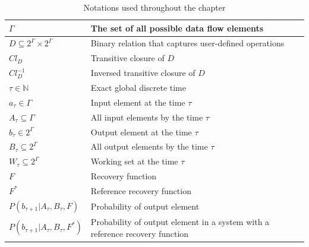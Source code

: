 \begin{table}[!b]
\begin {center}
    \caption{Notations used throughout the chapter}
    \begin{tabular}{l|p{5cm}}
        \hline
        $\Gamma$ & The set of all possible data flow elements \\ 
        \hline
        $D\subseteq{2^{\Gamma}\times2^{\Gamma}}$ & Binary relation that captures user-defined operations  \\
        \hline
        $Cl_D$ & Transitive closure of $D$  \\
        \hline
        $Cl^{-1}_D$ & Inversed transitive closure of $D$  \\
        \hline
        $\tau \in \mathbb{N}$ & Exact global discrete time \\
        \hline
        $a_\tau \in \Gamma$ & Input element at the time $\tau$ \\
        \hline
        $A_\tau \subseteq \Gamma$ & All input elements by the time $\tau$ \\
        \hline
        $b_\tau \in 2^{\Gamma}$ & Output element at the time $\tau$ \\
        \hline
        $B_\tau \subseteq 2^{\Gamma}$ & All output elements by the time $\tau$ \\
        \hline
        $W_\tau \subseteq 2^{\Gamma}$ & Working set at the time $\tau$ \\
        \hline
        $F$ & Recovery function \\
        \hline
        $F^{*}$ & Reference recovery function \\
        \hline
        $P(b_{\tau+1}|A_{\tau}, B_\tau, F)$ & Probability of output element \\
        \hline
        $P(b_{\tau+1}|A_{\tau}, B_\tau, F^{*})$ & Probability of output element in a system with a reference recovery function \\
    \end{tabular}
    \label{notations}
\end {center}
\end{table}


